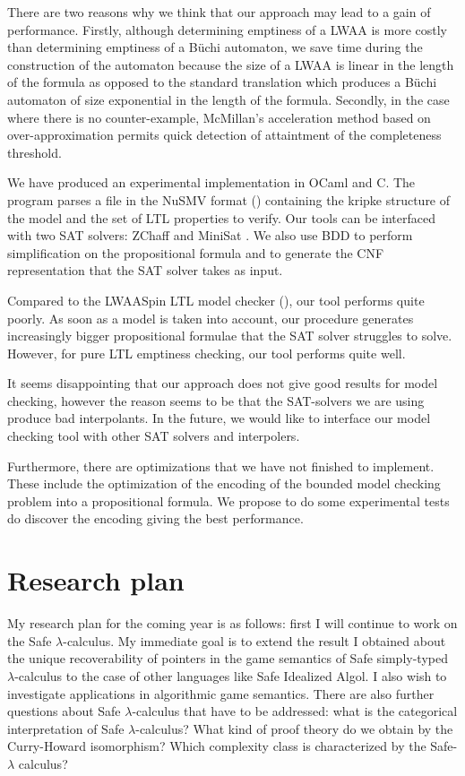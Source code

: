 There are two reasons why we think that our approach may lead to a
gain of performance. Firstly, although determining emptiness of a
LWAA is more costly than determining emptiness of a B\"uchi
automaton, we save time during the construction of the automaton
because the size of a LWAA is linear in the length of the formula as
opposed to the standard translation which produces a B\"uchi
automaton of size exponential in the length of the formula.
Secondly, in the case where there is no counter-example, McMillan's
acceleration method based on over-approximation permits quick
detection of attaintment of the completeness threshold.


We have produced an experimental implementation in OCaml and C. The
program parses a file in the NuSMV format (\cite{CAV02:nusmv})
containing the kripke structure of the model and the set of LTL
properties to verify. Our tools can be interfaced with two SAT
solvers: ZChaff \citep{zChaff} and MiniSat \citep{ES03}. We also use
BDD to perform simplification on the propositional formula and to
generate the CNF representation that the SAT solver takes as input.

Compared to the LWAASpin LTL model checker (\cite{hammer:truly}),
our tool performs quite poorly. As soon as a model is taken into
account, our procedure generates increasingly bigger propositional
formulae that the SAT solver struggles to solve. However, for pure
LTL emptiness checking, our tool performs quite well.

It seems disappointing that our approach does not give good results
for model checking, however the reason seems to be that the
SAT-solvers we are using produce bad interpolants. In the future, we
would like to interface our model checking tool with other SAT
solvers and interpolers.

Furthermore, there are optimizations that we have not finished to
implement. These include the optimization of the encoding of the
bounded model checking problem into a propositional formula. We
propose to do some experimental tests do discover the encoding
giving the best performance.

\chapter*{Research plan}

My research plan for the coming year is as follows: first I will
continue to work on the Safe $\lambda$-calculus. My immediate goal
is to extend the result I obtained about the unique recoverability
of pointers in the game semantics of Safe simply-typed
$\lambda$-calculus to the case of other languages like Safe
Idealized Algol. I also wish to investigate applications in
algorithmic game semantics. There are also further questions about
Safe $\lambda$-calculus that have to be addressed: what is the
categorical interpretation of Safe $\lambda$-calculus? What kind of
proof theory do we obtain by the Curry-Howard isomorphism? Which
complexity class is characterized by the Safe-$\lambda$ calculus?


